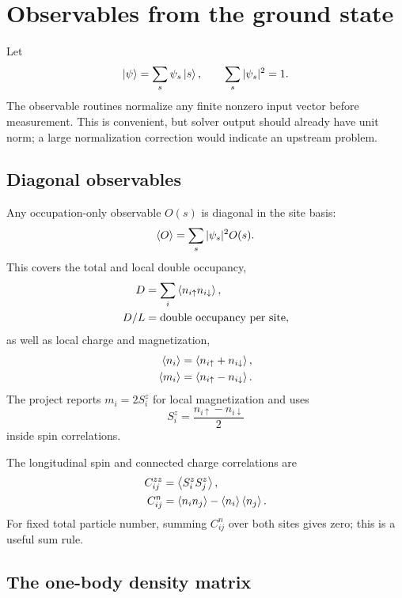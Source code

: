 \chapter{Observables from the ground state}
\label{chap:observables}

Let
\begin{equation}
\left\lvert \psi \right\rangle=\sum_s \psi_s\left\lvert s \right\rangle,\qquad
\sum_s|\psi_s|^2=1.
\end{equation}
The observable routines normalize any finite nonzero input vector before
measurement.  This is convenient, but solver output should already have unit
norm; a large normalization correction would indicate an upstream problem.

\section{Diagonal observables}

Any occupation-only observable $O(s)$ is diagonal in the site basis:
\begin{equation}
\left\langle O \right\rangle=\sum_s |\psi_s|^2 O(s).
\end{equation}
This covers the total and local double occupancy,
\begin{align}
D &= \sum_i\left\langle n_{i\uparrow}n_{i\downarrow} \right\rangle,\\
D/L &= \text{double occupancy per site},
\end{align}
as well as local charge and magnetization,
\begin{align}
\left\langle n_i \right\rangle &= \left\langle n_{i\uparrow}+n_{i\downarrow} \right\rangle,\\
\left\langle m_i \right\rangle &= \left\langle n_{i\uparrow}-n_{i\downarrow} \right\rangle.
\end{align}
The project reports $m_i=2S_i^z$ for local magnetization and uses
\begin{equation}
S_i^z=\frac{n_{i\uparrow}-n_{i\downarrow}}{2}
\end{equation}
inside spin correlations.

The longitudinal spin and connected charge correlations are
\begin{align}
C^{zz}_{ij} &= \left\langle S_i^zS_j^z \right\rangle,\\
C^n_{ij} &= \left\langle n_in_j \right\rangle-\left\langle n_i \right\rangle\left\langle n_j \right\rangle.
\end{align}
For fixed total particle number, summing $C^n_{ij}$ over both sites gives zero;
this is a useful sum rule.

\section{The one-body density matrix}

